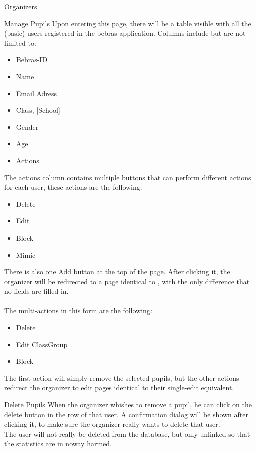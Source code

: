 \begin{section}{Organizers}
	\begin{subsection}{Manage Pupils}
		\label{sec:organizer_manage_pupils}
		Upon entering this page, there will be a table visible with all the (basic) users
		registered in the bebras application. Columns include but are not limited to:
		\begin{itemize}
			\item Bebras-ID
			\item Name
			\item Email Adress
			\item Class, [School]
			\item Gender
			\item Age
			\item Actions
		\end{itemize}
		The actions column contains multiple buttons that can perform different actions
		for each user, these actions are the following:
		\begin{itemize}
			\item Delete
			\item Edit
			\item Block
			\item Mimic
		\end{itemize}
		There is also one Add button at the top of the page. After clicking it, the
		organizer will be redirected to a page identical to
		, with the only difference that no fields
		are filled in. \\
		\\
		The multi-actions in this form are the following:
		\begin{itemize}
			\item Delete
			\item Edit ClassGroup
			\item Block
		\end{itemize}
		The first action will simply remove the selected pupils, but the other actions
		redirect the organizer to edit pages identical to their single-edit equivalent.
		\begin{subsubsection}{Delete Pupils}
			When the organizer whishes to remove a pupil, he can click on the delete
			button in the row of that user. A confirmation dialog will be shown after
			clicking it, to make sure the organizer really wants to delete that user. \\
			The user will not really be deleted from the database, but only unlinked so
			that the statistics are in noway harmed.
		\end{subsubsection}

\end{subsection}
\end{section}
